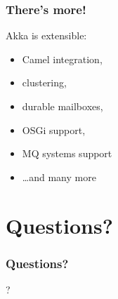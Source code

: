 \documentclass[xcolor=dvipsnames]{beamer}
\begin{document}
\begin{frame}
\frametitle{There's more!}
Akka is extensible:
\begin{itemize}
\item Camel integration,
\item clustering,
\item durable mailboxes,
\item OSGi support,
\item MQ systems support
\item \ldots and many more
\end{itemize}
\end{frame}

\section{Questions?}

\begin{frame}
\frametitle{Questions?}
\begin{center}
\Huge{?}
\end{center}
\end{frame}
\end{document}
